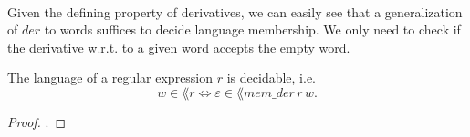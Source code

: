 \paragraph{} 
Given the defining property of derivatives, we can easily see that a generalization of $der$ to words suffices to decide language membership. We only need to check if the derivative w.r.t. to a given word accepts the empty word.


\begin{theorem}
    \label{mem_der_correct} 
    The language of a regular expression $r$ is decidable, i.e.
    \[     w \in \lang{r} \Leftrightarrow \varepsilon \in \lang{mem\_der \, r \, w}.      \]
\end{theorem}
\begin{proof}
    .
\end{proof}



